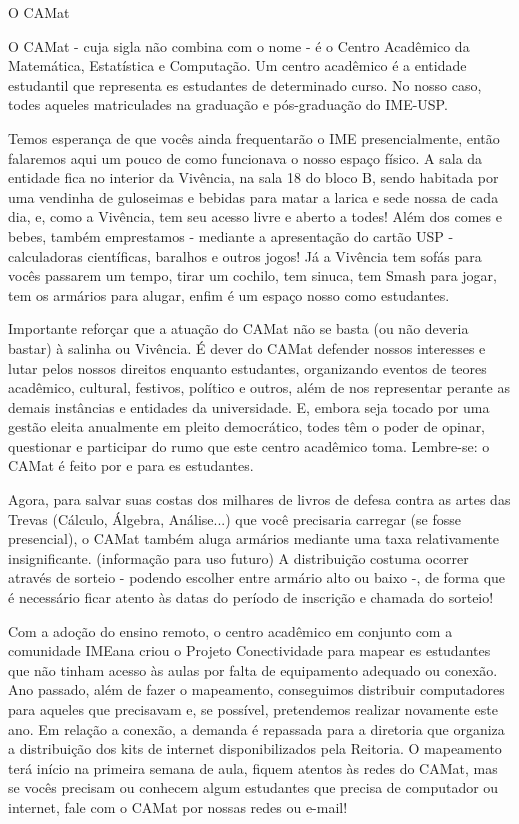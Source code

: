 \begin{secao}{O CAMat}

O CAMat - cuja sigla não combina com o nome - é o Centro Acadêmico da
Matemática, Estatística e Computação.  Um centro acadêmico é a entidade
estudantil que representa es estudantes de determinado curso. No nosso caso,
todes aqueles matriculades na graduação e pós-graduação do IME-USP.

Temos esperança de que vocês ainda frequentarão o IME presencialmente, então
falaremos aqui um pouco de como funcionava o nosso espaço físico. A sala da
entidade fica no interior da Vivência, na sala 18 do bloco B, sendo habitada
por uma vendinha de guloseimas e bebidas para matar a larica e sede nossa de
cada dia, e, como a Vivência, tem seu acesso livre e aberto a todes! Além dos
comes e bebes, também emprestamos - mediante a apresentação do cartão USP -
calculadoras científicas, baralhos e outros jogos! Já a Vivência tem sofás
para vocês passarem um tempo, tirar um cochilo, tem sinuca, tem Smash para jogar,
tem os armários para alugar, enfim é um espaço nosso como estudantes.

Importante reforçar que a atuação do CAMat não se basta (ou não deveria bastar)
à salinha ou Vivência. É dever do CAMat defender nossos interesses e lutar pelos
nossos direitos enquanto estudantes, organizando eventos de teores acadêmico,
cultural, festivos, político e outros, além de nos representar perante as demais
instâncias e entidades da universidade. E, embora seja tocado por uma gestão
eleita anualmente em pleito democrático, todes têm o poder de opinar, questionar
e participar do rumo que este centro acadêmico toma. Lembre-se: o CAMat é feito
por e para es estudantes. 

Agora, para salvar suas costas dos milhares de livros de defesa contra as artes
das Trevas (Cálculo, Álgebra, Análise...) que você precisaria carregar (se fosse
presencial), o CAMat também aluga armários mediante uma taxa relativamente
insignificante. (informação para uso futuro) A distribuição costuma ocorrer
através de sorteio - podendo escolher entre armário alto ou baixo -, de forma
que é necessário ficar atento às datas do período de inscrição e chamada do sorteio!

Com a adoção do ensino remoto, o centro acadêmico em conjunto com a comunidade
IMEana criou o Projeto Conectividade para mapear es estudantes que não tinham
acesso às aulas por falta de equipamento adequado ou conexão. Ano passado, além
de fazer o mapeamento, conseguimos distribuir computadores para aqueles que
precisavam e, se possível, pretendemos realizar novamente este ano. Em relação
a conexão, a demanda é repassada para a diretoria que organiza a distribuição
dos kits de internet disponibilizados pela Reitoria. O mapeamento terá início
na primeira semana de aula, fiquem atentos às redes do CAMat, mas se vocês
precisam ou conhecem algum estudantes que precisa de computador ou internet,
fale com o CAMat por nossas redes ou e-mail!


\end{secao}
